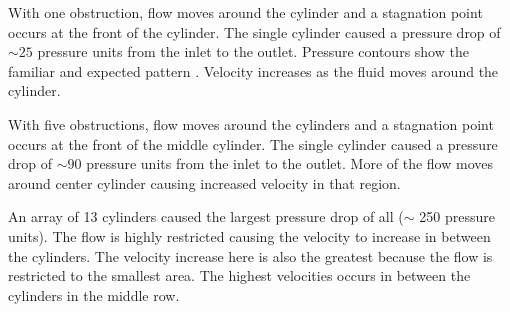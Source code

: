 \documentclass[wrr]{agutex}  %
\begin{document}
\begin{article}
With one obstruction, flow moves around the cylinder and a stagnation point occurs at the front of the cylinder.  The single cylinder caused a pressure drop of $\sim 25$ pressure units from the inlet to the outlet.  Pressure contours show the familiar and expected pattern \citep{White2006}.  Velocity increases as the fluid moves around the cylinder.  

With five obstructions, flow moves around the cylinders and a stagnation point occurs at the front of the middle cylinder.  The single cylinder caused a pressure drop of $\sim 90$ pressure units from the inlet to the outlet.   More of the flow moves around center cylinder causing increased velocity in that region. 

An array of 13 cylinders caused the largest pressure drop of all ($\sim$ 250 pressure units).   The flow is highly restricted causing the velocity to increase in between the cylinders.  The velocity increase here is also the greatest because the flow is restricted to the smallest area.  The highest velocities occurs in between the cylinders in the middle row.  


\end{article}
\end{document}
